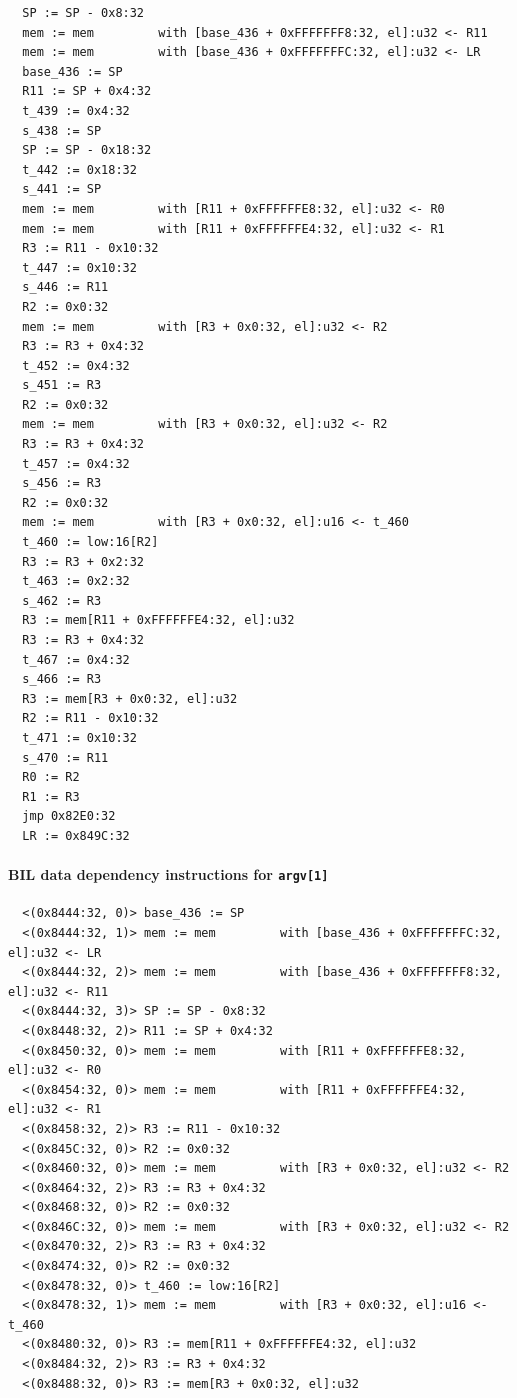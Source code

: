 \documentclass[letterpaper,11pt]{article}
\begin{document}
\begin{verbatim}
  SP := SP - 0x8:32
  mem := mem         with [base_436 + 0xFFFFFFF8:32, el]:u32 <- R11
  mem := mem         with [base_436 + 0xFFFFFFFC:32, el]:u32 <- LR
  base_436 := SP
  R11 := SP + 0x4:32
  t_439 := 0x4:32
  s_438 := SP
  SP := SP - 0x18:32
  t_442 := 0x18:32
  s_441 := SP
  mem := mem         with [R11 + 0xFFFFFFE8:32, el]:u32 <- R0
  mem := mem         with [R11 + 0xFFFFFFE4:32, el]:u32 <- R1
  R3 := R11 - 0x10:32
  t_447 := 0x10:32
  s_446 := R11
  R2 := 0x0:32
  mem := mem         with [R3 + 0x0:32, el]:u32 <- R2
  R3 := R3 + 0x4:32
  t_452 := 0x4:32
  s_451 := R3
  R2 := 0x0:32
  mem := mem         with [R3 + 0x0:32, el]:u32 <- R2
  R3 := R3 + 0x4:32
  t_457 := 0x4:32
  s_456 := R3
  R2 := 0x0:32
  mem := mem         with [R3 + 0x0:32, el]:u16 <- t_460
  t_460 := low:16[R2]
  R3 := R3 + 0x2:32
  t_463 := 0x2:32
  s_462 := R3
  R3 := mem[R11 + 0xFFFFFFE4:32, el]:u32
  R3 := R3 + 0x4:32
  t_467 := 0x4:32
  s_466 := R3
  R3 := mem[R3 + 0x0:32, el]:u32
  R2 := R11 - 0x10:32
  t_471 := 0x10:32
  s_470 := R11
  R0 := R2
  R1 := R3
  jmp 0x82E0:32
  LR := 0x849C:32
\end{verbatim}

\paragraph{BIL data dependency instructions for \texttt{argv[1]}}

\begin{verbatim}
  <(0x8444:32, 0)> base_436 := SP
  <(0x8444:32, 1)> mem := mem         with [base_436 + 0xFFFFFFFC:32, el]:u32 <- LR
  <(0x8444:32, 2)> mem := mem         with [base_436 + 0xFFFFFFF8:32, el]:u32 <- R11
  <(0x8444:32, 3)> SP := SP - 0x8:32
  <(0x8448:32, 2)> R11 := SP + 0x4:32
  <(0x8450:32, 0)> mem := mem         with [R11 + 0xFFFFFFE8:32, el]:u32 <- R0
  <(0x8454:32, 0)> mem := mem         with [R11 + 0xFFFFFFE4:32, el]:u32 <- R1
  <(0x8458:32, 2)> R3 := R11 - 0x10:32
  <(0x845C:32, 0)> R2 := 0x0:32
  <(0x8460:32, 0)> mem := mem         with [R3 + 0x0:32, el]:u32 <- R2
  <(0x8464:32, 2)> R3 := R3 + 0x4:32
  <(0x8468:32, 0)> R2 := 0x0:32
  <(0x846C:32, 0)> mem := mem         with [R3 + 0x0:32, el]:u32 <- R2
  <(0x8470:32, 2)> R3 := R3 + 0x4:32
  <(0x8474:32, 0)> R2 := 0x0:32
  <(0x8478:32, 0)> t_460 := low:16[R2]
  <(0x8478:32, 1)> mem := mem         with [R3 + 0x0:32, el]:u16 <- t_460
  <(0x8480:32, 0)> R3 := mem[R11 + 0xFFFFFFE4:32, el]:u32
  <(0x8484:32, 2)> R3 := R3 + 0x4:32
  <(0x8488:32, 0)> R3 := mem[R3 + 0x0:32, el]:u32
\end{verbatim}
\end{document}
